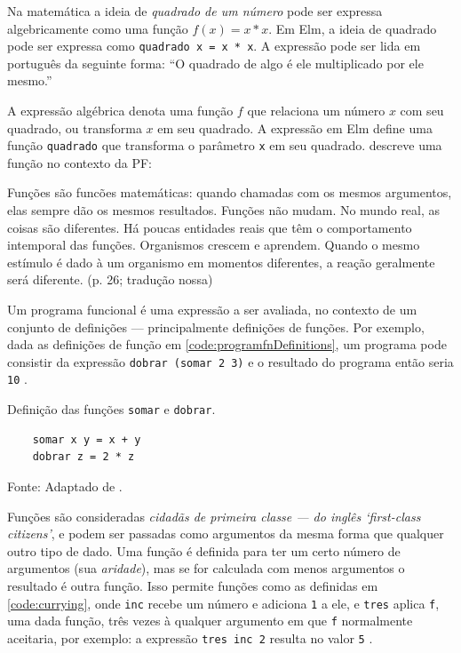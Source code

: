 Na matemática a ideia de \emph{quadrado de um número} pode ser expressa
algebricamente como uma função \(f(x)=x*x\).
Em Elm,  a ideia de quadrado pode ser
expressa como \texttt{quadrado x = x * x}.
A expressão pode ser lida em português da seguinte forma: “O quadrado de algo
é ele multiplicado por ele mesmo.”

A expressão algébrica denota uma função \(f\) que relaciona um número \(x\) com
seu quadrado, ou transforma \(x\) em seu quadrado.
A expressão em Elm define uma função \texttt{quadrado} que transforma o
parâmetro \texttt{x} em seu quadrado.
\textcite{roy2009} descreve uma função no contexto da PF:

\begin{citacao}
  Funções são funcões matemáticas: quando chamadas com os mesmos argumentos,
  elas sempre dão os mesmos resultados. Funções não mudam. No mundo real,
  as coisas são diferentes. Há poucas entidades reais que têm o comportamento
  intemporal das funções. Organismos crescem e aprendem. Quando o mesmo
  estímulo é dado à um organismo em momentos diferentes, a reação geralmente
  será diferente. (p. 26; tradução nossa)
\end{citacao}

Um programa funcional é uma expressão a ser avaliada, no contexto de um
conjunto de definições — principalmente definições de funções.
Por exemplo, dada as definições de função em \ref{code:programfnDefinitions}, um
programa pode consistir da expressão \texttt{dobrar (somar 2 3)} e o resultado
do programa então seria \texttt{10} \cite{noble1994}.

\begin{listing}[H]
  \centering
  \caption{Definição das funções \texttt{somar} e \texttt{dobrar}.}
  \begin{verbatim}
    somar x y = x + y
    dobrar z = 2 * z
  \end{verbatim}
  \small Fonte: Adaptado de \textcite{noble1994}.
  \label{code:programfnDefinitions}
\end{listing}

Funções são consideradas \emph{cidadãs de primeira classe — do inglês ‘first-class
citizens’}, e podem ser passadas como argumentos da mesma forma que qualquer
outro tipo de dado.
Uma função é definida para ter um certo número de argumentos (sua \emph{aridade}),
mas se for calculada com menos argumentos o resultado é outra função.
Isso permite funções como as definidas em \ref{code:currying}, onde \texttt{inc} recebe
um número e adiciona \texttt{1} a ele, e \texttt{tres} aplica \texttt{f}, uma dada função, três
vezes à qualquer argumento em que \texttt{f} normalmente aceitaria, por exemplo: a
expressão \texttt{tres inc 2} resulta no valor \texttt{5} \cite{noble1994}.

